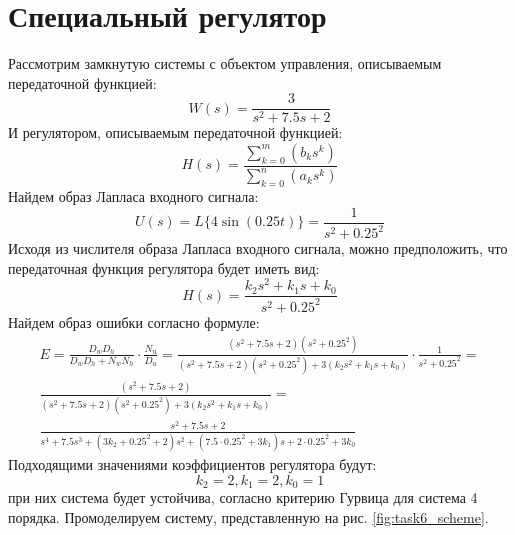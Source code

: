 \section{Специальный регулятор}

Рассмотрим замкнутую системы с объектом управления, описываемым передаточной функцией:
\begin{equation}
    W(s) = \frac{3}{s^2 + 7.5s + 2}
\end{equation}
И регулятором, описываемым передаточной функцией:
\begin{equation}
    H(s) = \frac{\sum_{k=0}^{m}(b_ks^k)}{\sum_{k=0}^{n}(a_ks^k)}
\end{equation}
Найдем образ Лапласа входного сигнала:
\begin{equation}
    U(s) = L\{4 \sin(0.25 t)\} = \frac{1}{s^2 + 0.25^2}
\end{equation}
Исходя из числителя образа Лапласа входного сигнала, можно предположить, что передаточная функция регулятора будет иметь вид:
\begin{equation}
    H(s) = \frac{k_2s^2 + k_1s + k_0}{s^2 + 0.25^2}
\end{equation}
Найдем образ ошибки согласно формуле:
\begin{multline}
    E = \frac{D_wD_h}{D_wD_h + N_wN_h} \cdot \frac{N_u}{D_u} = \frac{(s^2 + 7.5s + 2)(s^2 + 0.25^2)}{(s^2 + 7.5s + 2)(s^2 + 0.25^2) + 3(k_2s^2 + k_1s + k_0)} \cdot \frac{1}{s^2 + 0.25^2} =  \\
    \frac{(s^2 + 7.5s + 2)}{(s^2 + 7.5s + 2)(s^2 + 0.25^2) + 3(k_2s^2 + k_1s + k_0)}  = \\
    \frac{s^2 + 7.5s + 2}{s^4 + 7.5s^3 + (3k_2 + 0.25^2 + 2)s^2 + (7.5 \cdot 0.25^2 + 3k_1)s + 2 \cdot 0.25^2 + 3k_0}
\end{multline}
Подходящими значениями коэффициентов регулятора будут:
\begin{equation}
    k_2 = 2, k_1 = 2, k_0 = 1
\end{equation}
при них система будет устойчива, согласно критерию Гурвица для система 4 порядка. Промоделируем систему, представленную на рис. \ref{fig:task6_scheme}.

